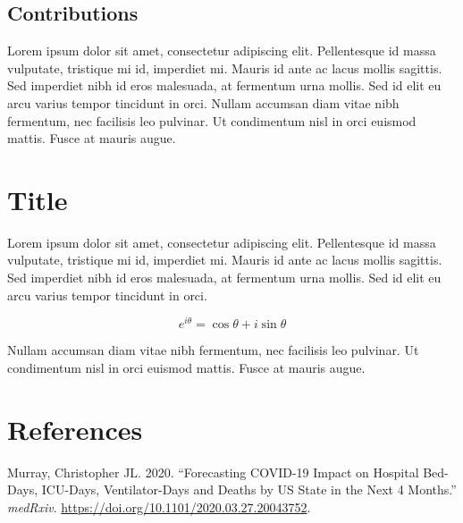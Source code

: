 \documentclass[
]{hdsr}
\newlength{\cslhangindent}
\newlength{\cslentryspacingunit} %
\newenvironment{CSLReferences}[2] %
 {%
  \setlength{\parindent}{0pt}
  \ifodd #1
  \let\oldpar\par
  \def\par{\hangindent=\cslhangindent\oldpar}
  \fi
  \setlength{\parskip}{#2\cslentryspacingunit}
 }%
 {}
\begin{document}
\hypertarget{contributions}{%
\subsection*{Contributions}\label{contributions}}

Lorem ipsum dolor sit amet, consectetur adipiscing elit. Pellentesque id
massa vulputate, tristique mi id, imperdiet mi. Mauris id ante ac lacus
mollis sagittis. Sed imperdiet nibh id eros malesuada, at fermentum urna
mollis. Sed id elit eu arcu varius tempor tincidunt in orci. Nullam
accumsan diam vitae nibh fermentum, nec facilisis leo pulvinar. Ut
condimentum nisl in orci euismod mattis. Fusce at mauris augue.

\hypertarget{sec-appendix-customize-this-label}{%
\section{Title}\label{sec-appendix-customize-this-label}}

Lorem ipsum dolor sit amet, consectetur adipiscing elit. Pellentesque id
massa vulputate, tristique mi id, imperdiet mi. Mauris id ante ac lacus
mollis sagittis. Sed imperdiet nibh id eros malesuada, at fermentum urna
mollis. Sed id elit eu arcu varius tempor tincidunt in orci.

\[
e^{i\theta} = \cos \theta + i\sin \theta
\]

Nullam accumsan diam vitae nibh fermentum, nec facilisis leo pulvinar.
Ut condimentum nisl in orci euismod mattis. Fusce at mauris augue.

\hypertarget{bibliography}{%
\section*{References}\label{bibliography}}

\hypertarget{refs}{}
\begin{CSLReferences}{1}{0}
\leavevmode{}%
Murray, Christopher JL. 2020. {``Forecasting {COVID-19} Impact on
Hospital Bed-Days, {ICU}-Days, Ventilator-Days and Deaths by {US} State
in the Next 4 Months.''} \emph{medRxiv}.
\url{https://doi.org/10.1101/2020.03.27.20043752}.

\end{CSLReferences}
\end{document}
